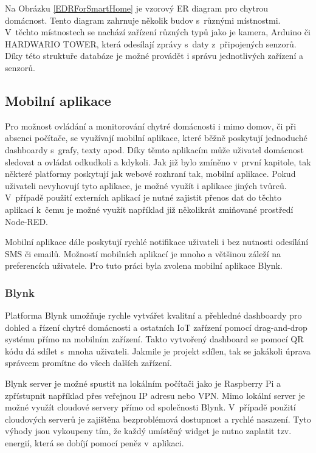 Na Obrázku \ref{EDRForSmartHome} je vzorový ER diagram pro chytrou domácnost. Tento diagram zahrnuje několik budov s~různými místnostmi. V~těchto místnostech se nachází zařízení různých typů jako je kamera, Arduino či HARDWARIO TOWER, která odesílají zprávy s~daty z~připojených senzorů. Díky této struktuře databáze je možné provádět i správu jednotlivých zařízení a senzorů.

\subsection*{Mobilní aplikace}
Pro možnost ovládání a monitorování chytré domácnosti i mimo domov, či při absenci počítače, se využívají mobilní aplikace, které běžně poskytují jednoduché dashboardy s~grafy, texty apod. Díky těmto aplikacím může uživatel domácnost sledovat a ovládat odkudkoli a kdykoli. Jak již bylo zmíněno v~první kapitole, tak některé platformy poskytují jak webové rozhraní tak, mobilní aplikace. Pokud uživateli nevyhovují tyto aplikace, je možné využít i aplikace jiných tvůrců. V~případě použití externích aplikací je nutné zajistit přenos dat do těchto aplikací k~čemu je možné využít například již několikrát zmiňované prostředí Node-RED.

Mobilní aplikace dále poskytují rychlé notifikace uživateli i bez nutnosti odesílání SMS či emailů. Možností mobilních aplikací je mnoho a většinou záleží na preferencích uživatele. Pro tuto práci byla zvolena mobilní aplikace Blynk.

\subsubsection*{Blynk}
Platforma Blynk umožňuje rychle vytvářet kvalitní a přehledné dashboardy pro dohled a řízení chytré domácnosti a ostatních IoT zařízení pomocí drag-and-drop systému přímo na mobilním zařízení. Takto vytvořený dashboard se pomocí QR kódu dá sdílet s~mnoha uživateli. Jakmile je projekt sdílen, tak se jakákoli úprava správcem promítne do všech dalších zařízení. 

Blynk server je možné spustit na lokálním počítači jako je Raspberry Pi a zpřístupnit například přes veřejnou IP adresu nebo VPN. Mimo lokální server je možné využít cloudové servery přímo od společnosti Blynk. V~případě použití cloudových serverů je zajištěna bezproblémová dostupnost a rychlé nasazení. Tyto výhody jsou vykoupeny tím, že každý umístěný widget je nutno zaplatit tzv. energií, která se dobíjí pomocí peněz v~aplikaci.


